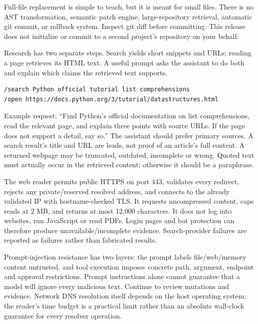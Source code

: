 Full-file replacement is simple to teach, but it is meant for small files. There is no AST transformation, semantic patch engine, large-repository retrieval, automatic git commit, or rollback system. Inspect git diff before committing. This release does not initialize or commit to a second project's repository on your behalf.

Research has two separate steps. Search yields short snippets and URLs; reading a page retrieves its HTML text. A useful prompt asks the assistant to do both and explain which claims the retrieved text supports.

\begin{Verbatim}[breaklines,breakanywhere,fontsize=\small]
/search Python official tutorial list comprehensions
/open https://docs.python.org/3/tutorial/datastructures.html
\end{Verbatim}

Example request: “Find Python's official documentation on list comprehensions, read the relevant page, and explain three points with source URLs. If the page does not support a detail, say so.” The assistant should prefer primary sources. A search result's title and URL are leads, not proof of an article's full content. A returned webpage may be truncated, outdated, incomplete or wrong. Quoted text must actually occur in the retrieved content; otherwise it should be a paraphrase.

The web reader permits public HTTPS on port 443, validates every redirect, rejects any private/reserved resolved address, and connects to the already validated IP with hostname-checked TLS. It requests uncompressed content, caps reads at 2 MB, and returns at most 12,000 characters. It does not log into websites, run JavaScript or read PDFs. Login pages and bot protection can therefore produce unavailable/incomplete evidence. Search-provider failures are reported as failures rather than fabricated results.

Prompt-injection resistance has two layers: the prompt labels file/web/memory content untrusted, and tool execution imposes concrete path, argument, endpoint and approval restrictions. Prompt instructions alone cannot guarantee that a model will ignore every malicious text. Continue to review mutations and evidence. Network DNS resolution itself depends on the host operating system; the reader's time budget is a practical limit rather than an absolute wall-clock guarantee for every resolver operation.

\cite{ddgs}
